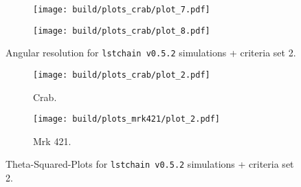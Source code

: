\begin{figure}
    \centering
    \begin{subfigure}{0.49\textwidth}
        \centering
        \texttt{[image: build/plots\_crab/plot\_7.pdf]}
        \label{fig:ang_res_newMC_150_1}
    \end{subfigure}
    \hfill
    \begin{subfigure}{0.49\textwidth}
        \centering
        \texttt{[image: build/plots\_crab/plot\_8.pdf]}
        \label{fig:ang_res_newMC_150_2}
    \end{subfigure}
    \caption{Angular resolution for \texttt{lstchain v0.5.2} simulations + criteria set 2.}
\end{figure}

\begin{figure}
    \centering
    \begin{subfigure}{0.49\textwidth}
        \centering
        \texttt{[image: build/plots\_crab/plot\_2.pdf]}
        \caption{Crab.}
        \label{fig:crab_newMC_150}
    \end{subfigure}
    \hfill
    \begin{subfigure}{0.49\textwidth}
        \centering
        \texttt{[image: build/plots\_mrk421/plot\_2.pdf]}
        \caption{Mrk 421.}
        \label{fig:mrk_newMC_150}
    \end{subfigure}
    \caption{Theta-Squared-Plots for \texttt{lstchain v0.5.2} simulations + criteria set 2.}
\end{figure}



